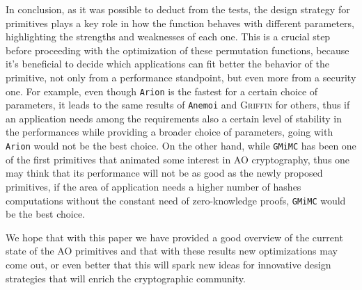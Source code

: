 \documentclass[12pt, a4paper]{report}
\begin{document}
In conclusion, as it was possible to deduct from the tests, the design strategy for primitives plays a key role in how the function behaves with different parameters, highlighting the strengths and weaknesses of each one.
This is a crucial step before proceeding with the optimization of these permutation functions, because it's beneficial to decide which applications can fit better the behavior of the primitive, not only from a performance standpoint, but even more from a security one.
For example, even though \texttt{Arion} is the fastest for a certain choice of parameters, it leads to the same results of \texttt{Anemoi} and \textsc{Griffin} for others, thus if an application needs among the requirements also a certain level of stability in the performances while providing a broader choice of parameters, going with \texttt{Arion} would not be the best choice.
On the other hand, while \texttt{GMiMC} has been one of the first primitives that animated some interest in AO cryptography, thus one may think that its performance will not be as good as the newly proposed primitives, if the area of application needs a higher number of hashes computations without the constant need of zero-knowledge proofs, \texttt{GMiMC} would be the best choice.

We hope that with this paper we have provided a good overview of the current state of the AO primitives and that with these results new optimizations may come out, or even better that this will spark new ideas for innovative design strategies that will enrich the cryptographic community.

\nocite{*}
\printbibliography[heading=bibnumbered]
\end{document}

